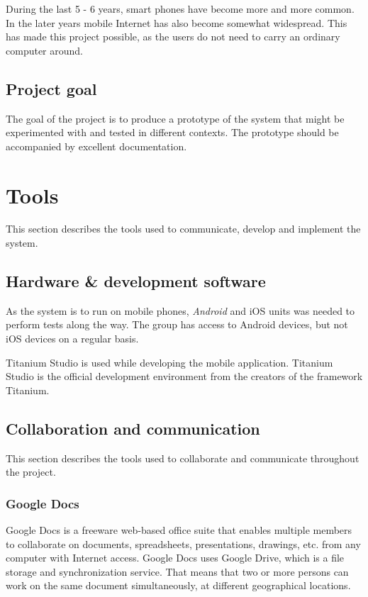 \documentclass[11pt]{book}
\begin{document}
During the last 5 - 6 years, smart phones have become more and more common. In the later years mobile Internet has also become somewhat widespread. This has made this project possible, as the users do not need to carry an ordinary computer around.

\subsection{Project goal}
The goal of the project is to produce a prototype of the system that might be experimented with and tested in different contexts. The prototype should be accompanied by excellent documentation.

\section{Tools}
This section describes the tools used to communicate, develop and implement the system.

\subsection{Hardware \& development software}
As the system is to run on mobile phones, \emph{Android} and iOS units was needed to perform tests along the way. The group has access to Android devices, but not iOS devices on a regular basis.

Titanium Studio\cite{titaniumStudio} is used while developing the mobile application. Titanium Studio is the official development environment from the creators of the framework Titanium.

\subsection{Collaboration and communication}
This section describes the tools used to collaborate and communicate throughout the project.

\subsubsection{Google Docs}
Google Docs\cite{googleDocs} is a freeware web-based office suite that enables multiple members to collaborate on documents, spreadsheets, presentations, drawings, etc. from any computer with Internet access. Google Docs uses Google Drive, which is a file storage and synchronization service. That means that two or more persons can work on the same document simultaneously, at different geographical locations. 
\end{document}
